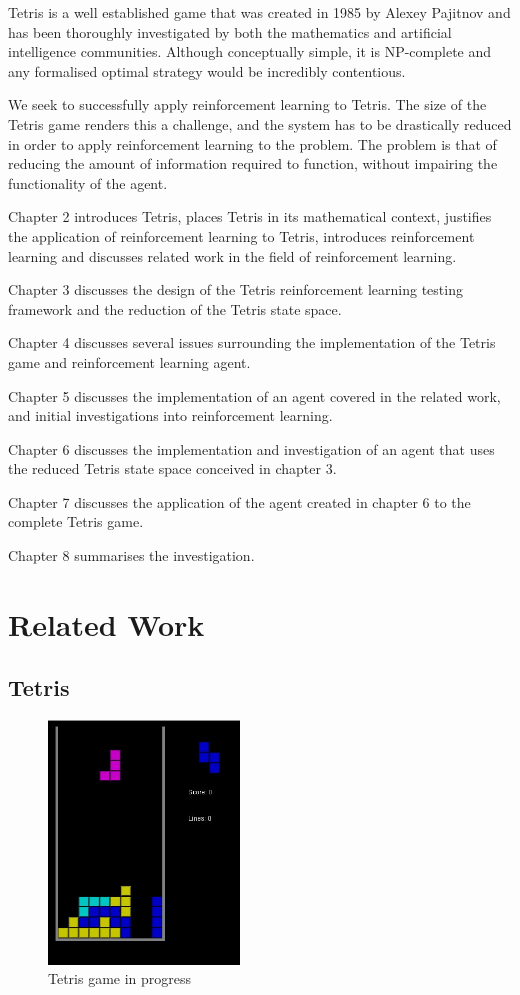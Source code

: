 \documentclass{rucsthesis}
\begin{document}
Tetris is a well established game that was created in 1985 by Alexey Pajitnov and has been thoroughly investigated by both the mathematics and artificial intelligence communities. Although conceptually simple, it is NP-complete \citep{hardtet} and any formalised optimal strategy would be incredibly contentious.

We seek to successfully apply reinforcement learning to Tetris. The size of the Tetris game renders this a challenge, and the system has to be drastically reduced in order to apply reinforcement learning to the problem. The problem is that of reducing the amount of information required to function, without impairing the functionality of the agent.

Chapter 2 introduces Tetris, places Tetris in its mathematical context, justifies the application of reinforcement learning to Tetris, introduces reinforcement learning and discusses related work in the field of reinforcement learning.

Chapter 3 discusses the design of the Tetris reinforcement learning testing framework and the reduction of the Tetris state space.

Chapter 4 discusses several issues surrounding the implementation of the Tetris game and reinforcement learning agent.

Chapter 5 discusses the implementation of an agent covered in the related work, and initial investigations into reinforcement learning.

Chapter 6 discusses the implementation and investigation of an agent that uses the reduced Tetris state space conceived in chapter 3.

Chapter 7 discusses the application of the agent created in chapter 6 to the complete Tetris game.

Chapter 8 summarises the investigation.

\chapter{Related Work}

\section{Tetris}

\begin{figure}[h]
\centering%
\includegraphics[width=2in]{tetgame.jpg}
\caption{Tetris game in progress}
\label{fig:tetgame}
\end{figure}
\end{document}
